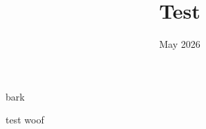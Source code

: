 \documentclass[12pt]{article}
\title{Test}
\author{}
\date{May 2026}
\begin{document}
\maketitle


bark \cite{bertram_two_2026}

test woof \cite{addona_solving_2025}



\printbibliography
\end{document}
